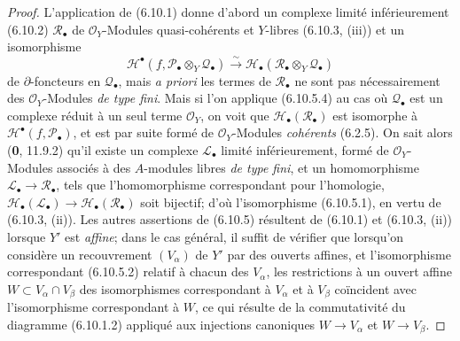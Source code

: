 \begin{proof}
L'application de (6.10.1) donne d'abord un complexe limité inférieurement
(6.10.2) $\mathscr R_\bullet$ de $\mathscr O_Y$-Modules quasi-cohérents et
$Y$-libres (6.10.3, (iii)) et un isomorphisme
\[
  \mathscr H^\bullet
  (f,\mathscr P_\bullet\otimes_Y\mathscr Q_\bullet)
  \xrightarrow{\sim}
  \mathscr H_\bullet
  (\mathscr R_\bullet\otimes_Y\mathscr Q_\bullet)
  \tag{6.10.5.4}\label{III.6.10.5.4.fr}
\]
de $\partial$-foncteurs en $\mathscr Q_\bullet$, mais \emph{a priori} les
termes de $\mathscr R_\bullet$ ne sont pas nécessairement des
$\mathscr O_Y$-Modules \emph{de type fini}. Mais si l'on applique (6.10.5.4) au cas
où $\mathscr Q_\bullet$ est un complexe réduit à un seul terme
$\mathscr O_Y$, on voit que $\mathscr H_\bullet(\mathscr R_\bullet)$ est
isomorphe à $\mathscr H^\bullet(f,\mathscr P_\bullet)$, et est par suite formé
de $\mathscr O_Y$-Modules \emph{cohérents} (6.2.5). On sait alors (\textbf{0}, 11.9.2) qu'il
existe un complexe $\mathscr L_\bullet$ limité inférieurement, formé de
$\mathscr O_Y$-Modules associés à des $A$-modules libres \emph{de type fini}, et un
homomorphisme $\mathscr L_\bullet\longrightarrow\mathscr R_\bullet$,
tels que l'homomorphisme correspondant pour l'homologie,
$\mathscr H_\bullet(\mathscr L_\bullet)\longrightarrow\mathscr H_\bullet(\mathscr R_\bullet)$
soit bijectif; d'où l'isomorphisme (6.10.5.1), en vertu de (6.10.3, (ii)).
Les autres assertions de (6.10.5) résultent de (6.10.1) et (6.10.3, (ii))
lorsque $Y'$ est \emph{affine}; dans le cas général, il suffit de vérifier que
lorsqu'on considère un recouvrement $(V_\alpha)$ de $Y'$ par des ouverts
affines, et l'isomorphisme correspondant (6.10.5.2) relatif à chacun des
$V_\alpha$, les restrictions à un ouvert affine
$W\subset V_\alpha\cap V_\beta$ des isomorphismes correspondant à
$V_\alpha$ et à $V_\beta$ coïncident avec l'isomorphisme correspondant à
$W$, ce qui résulte de la commutativité du diagramme (6.10.1.2) appliqué aux
injections canoniques $W\to V_\alpha$ et $W\to V_\beta$.
\end{proof}


